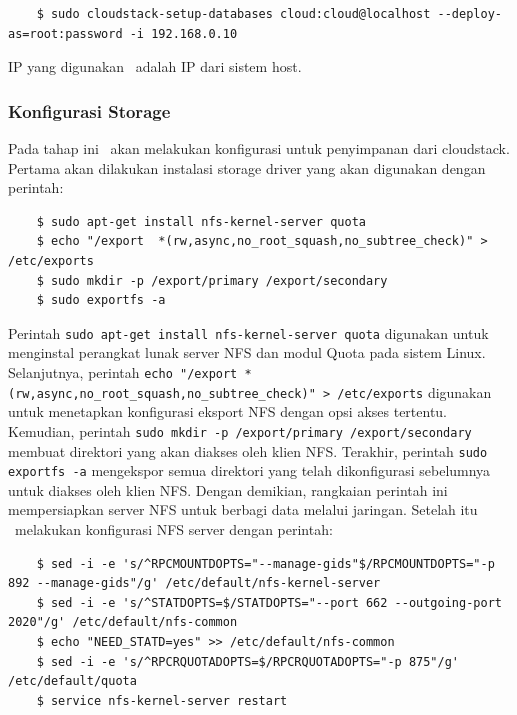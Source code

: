\begin{listing}[H]
    \begin{verbatim}       
    $ sudo cloudstack-setup-databases cloud:cloud@localhost --deploy-as=root:password -i 192.168.0.10
    \end{verbatim}
\end{listing}

IP yang digunakan \saya\ adalah IP dari sistem host.

\subsubsection{Konfigurasi Storage}
Pada tahap ini \saya\ akan melakukan konfigurasi untuk penyimpanan dari cloudstack. Pertama akan dilakukan instalasi storage driver yang akan digunakan dengan perintah:

\begin{listing}[H]
    \begin{verbatim}       
    $ sudo apt-get install nfs-kernel-server quota
    $ echo "/export  *(rw,async,no_root_squash,no_subtree_check)" > /etc/exports
    $ sudo mkdir -p /export/primary /export/secondary
    $ sudo exportfs -a
    \end{verbatim}
\end{listing}

Perintah \texttt{sudo apt-get install nfs-kernel-server quota} digunakan untuk menginstal perangkat lunak server NFS dan modul Quota pada sistem Linux. Selanjutnya, perintah \texttt{echo "/export *(rw,async,no\_root\_squash,no\_subtree\_check)" > /etc/exports} digunakan untuk menetapkan konfigurasi eksport NFS dengan opsi akses tertentu. Kemudian, perintah \texttt{sudo mkdir -p /export/primary /export/secondary} membuat direktori yang akan diakses oleh klien NFS. Terakhir, perintah \texttt{sudo exportfs -a} mengekspor semua direktori yang telah dikonfigurasi sebelumnya untuk diakses oleh klien NFS. Dengan demikian, rangkaian perintah ini mempersiapkan server NFS untuk berbagi data melalui jaringan. Setelah itu \saya\ melakukan konfigurasi NFS server dengan perintah:

\begin{listing}[H]
    \begin{verbatim} 
    $ sed -i -e 's/^RPCMOUNTDOPTS="--manage-gids"$/RPCMOUNTDOPTS="-p 892 --manage-gids"/g' /etc/default/nfs-kernel-server
    $ sed -i -e 's/^STATDOPTS=$/STATDOPTS="--port 662 --outgoing-port 2020"/g' /etc/default/nfs-common
    $ echo "NEED_STATD=yes" >> /etc/default/nfs-common
    $ sed -i -e 's/^RPCRQUOTADOPTS=$/RPCRQUOTADOPTS="-p 875"/g' /etc/default/quota
    $ service nfs-kernel-server restart
    \end{verbatim}
\end{listing}

